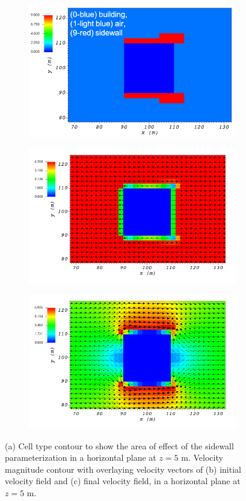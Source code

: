 \begin{figure}[H]
    \centering
    \begin{subfigure}{\textwidth}
    \centering
    \includegraphics[width=10.3cm,keepaspectratio]{Images/sidewall_z_5_1_init_icell.png}
    \caption{}
    \end{subfigure}
    \begin{subfigure}{\textwidth}
    \centering
    \includegraphics[width=11.0cm,keepaspectratio]{Images/sidewall_z_5_1_init_vel.png}
    \caption{}
    \end{subfigure}
    \begin{subfigure}{\textwidth}
    \centering
    \includegraphics[width=11.0cm,keepaspectratio]{Images/sidewall_z_5_1_final.png}
    \caption{}
    \end{subfigure}
    \caption{(a) Cell type contour to show the area of effect of the sidewall parameterization in a horizontal plane at $z=5$ m. Velocity magnitude contour with overlaying velocity vectors of (b) initial velocity field and (c) final velocity field, in a horizontal plane at $z=5$ m.}
\end{figure}


